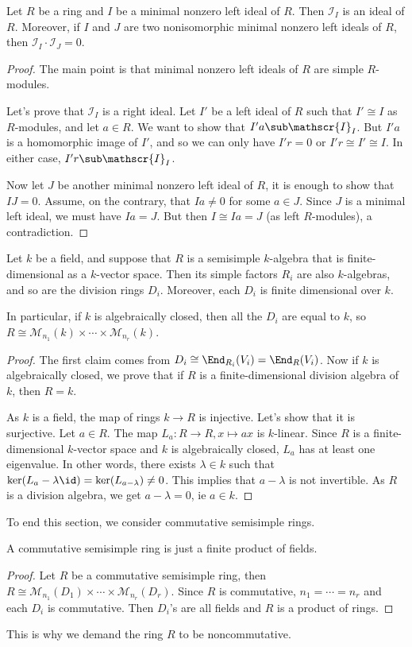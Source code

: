 \begin{lemma}
Let $R$ be a ring and $I$ be a minimal nonzero left ideal of $R$. Then $\mathscr{I}_I$ is an ideal of $R$. Moreover, if $I$ and $J$ are two nonisomorphic minimal nonzero left ideals of $R$, then $\mathscr{I}_I\cdot\mathscr{I}_J=0$.
\end{lemma}
\begin{proof}
The main point is that minimal nonzero left ideals of $R$ are simple $R$-modules.\par
Let's prove that $\mathscr{I}_I$ is a right ideal. Let $I'$ be a left ideal of $R$ such that $I'\cong I$ as $R$-modules, and let $a\in R$. We want to show that $I'a\sub\mathscr{I}_I$. But $I'a$ is a homomorphic image of $I'$, and so we can only have $I'r=0$ or $I'r\cong I'\cong I$. In either case, $I'r\sub\mathscr{I}_I$.\par
Now let $J$ be another minimal nonzero left ideal of $R$, it is enough to show that $IJ=0$. Assume, on the contrary, that $Ia\neq0$ for some $a\in J$. Since $J$ is a minimal left ideal, we must have $Ia=J$. But then $I\cong Ia=J$ (as left $R$-modules), a contradiction.
\end{proof}
\begin{proposition}\label{semisimple finite dim ring}
Let $k$ be a field, and suppose that $R$ is a semisimple $k$-algebra that is finite-dimensional as a $k$-vector space. Then its simple factors $R_i$ are also $k$-algebras, and so are the division rings $D_i$. Moreover, each $D_i$ is finite dimensional over $k$.\par
In particular, if $k$ is algebraically closed, then all the $D_i$ are equal to $k$, so $R\cong\mathcal{M}_{n_1}(k)\times\cdots\times\mathcal{M}_{n_r}(k)$.
\end{proposition}
\begin{proof}
The first claim comes from $D_i\cong\End_{R_i}(V_i)=\End_R(V_i)$. Now if $k$ is algebraically closed, we prove that if $R$ is a finite-dimensional division algebra of $k$, then $R=k$.\par
As $k$ is a field, the map of rings $k\to R$ is injective. Let's show that it is surjective. Let $a\in R$. The map $L_a:R\to R,x\mapsto ax$ is $k$-linear. Since $R$ is a finite-dimensional $k$-vector space and $k$ is algebraically closed, $L_a$ has at least one eigenvalue. In other words, there exists $\lambda\in k$ such that $\ker(L_a-\lambda\id)=\ker(L_{a-\lambda})\neq0$. This implies that $a-\lambda$ is not invertible. As $R$ is a division algebra, we get $a-\lambda=0$, ie $a\in k$.
\end{proof}
To end this section, we consider commutative semisimple rings.
\begin{proposition}\label{semisimple commutative ring}
A commutative semisimple ring is just a finite product of fields.
\end{proposition}
\begin{proof}
Let $R$ be a commutative semisimple ring, then $R\cong\mathcal{M}_{n_1}(D_1)\times\cdots\times\mathcal{M}_{n_r}(D_r)$. Since $R$ is commutative, $n_1=\cdots=n_r$ and each $D_i$ is commutative. Then $D_i$'s are all fields and $R$ is a product of rings.
\end{proof}
 This is why we demand the ring $R$ to be noncommutative.
